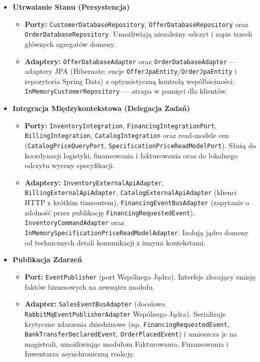 \begin{itemize}
    \item \textbf{Utrwalanie Stanu (Persystencja)}
    \begin{itemize}
        \item \textbf{Porty:} \texttt{CustomerDatabaseRepository}, \texttt{OfferDatabaseRepository} oraz \texttt{OrderDatabaseRepository}. Umożliwiają niezależny odczyt i zapis trzech głównych agregatów domeny.
        \item \textbf{Adaptery:} \texttt{OfferDatabaseAdapter} oraz \texttt{OrderDatabaseAdapter} — adaptery JPA (Hibernate; encje \texttt{OfferJpaEntity}/\texttt{OrderJpaEntity} i repozytoria Spring Data) z optymistyczną kontrolą współbieżności; \texttt{InMemoryCustomerRepository} — atrapa w pamięci dla klientów.
    \end{itemize}

    \item \textbf{Integracja Międzykontekstowa (Delegacja Zadań)}
    \begin{itemize}
        \item \textbf{Porty:} \texttt{InventoryIntegration}, \texttt{FinancingIntegrationPort}, \texttt{BillingIntegration}, \texttt{CatalogIntegration} oraz read-modele cen (\texttt{CatalogPriceQueryPort}, \texttt{SpecificationPriceReadModelPort}). Służą do koordynacji logistyki, finansowania i fakturowania oraz do lokalnego odczytu wyceny specyfikacji.
        \item \textbf{Adaptery:} \texttt{InventoryExternalApiAdapter}, \texttt{BillingExternalApiAdapter}, \texttt{CatalogExternalApiAdapter} (klienci HTTP z krótkim timeoutem), \texttt{FinancingEventBusAdapter} (zapytanie o zdolność przez publikację \texttt{FinancingRequestedEvent}), \texttt{InventoryCommandAdapter} oraz \texttt{InMemorySpecificationPriceReadModelAdapter}. Izolują jądro domeny od technicznych detali komunikacji z innymi kontekstami.
    \end{itemize}

    \item \textbf{Publikacja Zdarzeń}
    \begin{itemize}
        \item \textbf{Port:} \texttt{EventPublisher} (port Wspólnego Jądra). Interfejs zlecający emisję faktów biznesowych na zewnątrz modułu.
        \item \textbf{Adapter:} \texttt{SalesEventBusAdapter} (docelowo \texttt{RabbitMqEventPublisherAdapter} Wspólnego Jądra). Serializuje krytyczne zdarzenia dziedzinowe (np. \texttt{FinancingRequestedEvent}, \texttt{BankTransferDeclaredEvent}, \texttt{OrderPlacedEvent}) i umieszcza je na magistrali, umożliwiając modułom Fakturowania, Finansowania i Inwentarza asynchroniczną reakcję.
    \end{itemize}
\end{itemize}

